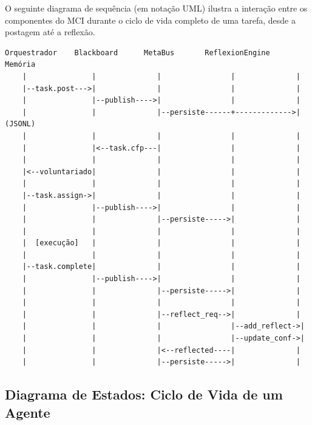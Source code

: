 O seguinte diagrama de sequência (em notação UML) ilustra a interação entre os componentes do MCI durante o ciclo de vida completo de uma tarefa, desde a postagem até a reflexão.

\begin{verbatim}
Orquestrador    Blackboard      MetaBus       ReflexionEngine   Memória
    |               |              |                |              |
    |--task.post--->|              |                |              |
    |               |--publish---->|                |              |
    |               |              |--persiste------+------------->| (JSONL)
    |               |              |                |              |
    |               |<--task.cfp---|                |              |
    |               |              |                |              |
    |<--voluntariado|              |                |              |
    |               |              |                |              |
    |--task.assign->|              |                |              |
    |               |--publish---->|                |              |
    |               |              |--persiste----->|              |
    |               |              |                |              |
    |  [execução]   |              |                |              |
    |               |              |                |              |
    |--task.complete|              |                |              |
    |               |--publish---->|                |              |
    |               |              |--persiste----->|              |
    |               |              |                |              |
    |               |              |--reflect_req-->|              |
    |               |              |                |--add_reflect->|
    |               |              |                |--update_conf->|
    |               |              |<--reflected----|              |
    |               |              |--persiste----->|              |
\end{verbatim}

\subsection{Diagrama de Estados: Ciclo de Vida de um Agente}

